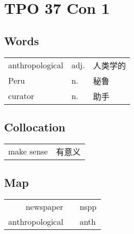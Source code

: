 \section{TPO 37 Con 1}

\subsection{Words}

\begin{tabular}{lll}
    anthropological & adj. & 人类学的 \\
    Peru            & n.   & 秘鲁   \\
    curator         & n.   & 助手   \\
\end{tabular}

\subsection{Collocation}

\begin{tabular}{ll}
    make sense & 有意义 \\
\end{tabular}

\subsection{Map}

\begin{tabular}{rc@{\quad$\to$\quad}l}
    newspaper       &  & nspp \\
    anthropological &  & anth \\
\end{tabular}
